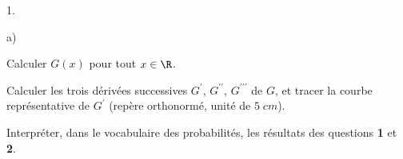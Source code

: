 \documentclass[11pt]{article}%
\begin{document}
\begin{noliste}{1.}
\begin{noliste}{a)}
 \setlength{\itemsep}{2mm}
\item Calculer $G\left( x\right) $ pour tout $x\in \R$.

\item Calculer les trois dérivées successives $G^{\prime }$, $G^{\prime
\prime }$, $G^{\prime \prime \prime }$ de $G$, et tracer la courbe
représentative de $G^{\prime }$ (repère orthonormé, unité de $5\;cm$).
\end{noliste}

\item Interpréter, dans le vocabulaire des probabilités, les résultats
des
questions \textbf{1} et \textbf{2}.
\end{noliste}

\label{fin}
\end{document}

